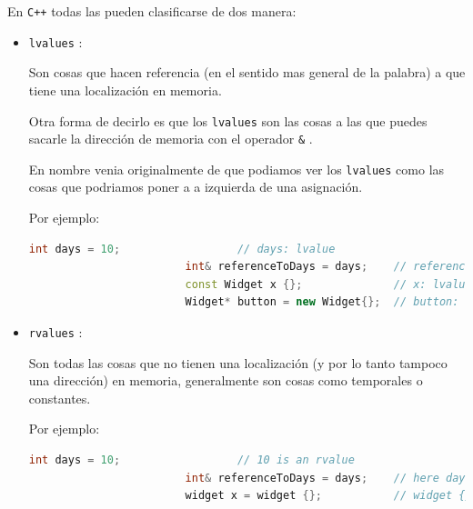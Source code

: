 \documentclass[12pt, fleqn]{report}                             %
\newcommand \Quote              {\qq}                           %
\theoremstyle{break}                                            %
\newcommand{\textCode}[1]  { \texttt{#1} }                      %
\newcommand \Cpp  {\textCode{C++} }                               %
\begin{document}
            En \Cpp todas las \Quote{cosas} pueden clasificarse de dos manera:
            \begin{itemize}
                \item \textCode{lvalues}: 
                
                    Son cosas que hacen referencia (en el sentido mas general de la palabra)
                    a \Quote{algo} que tiene una localización en memoria.

                    Otra forma de decirlo es que los \textCode{lvalues} son las cosas a las que 
                    puedes sacarle la dirección de memoria con el operador \textCode{\&}.

                    En nombre venia originalmente de que podiamos ver los \textCode{lvalues} 
                    como las cosas que podriamos poner a a izquierda de una asignación.

                    Por ejemplo:
                    \begin{lstlisting}[language=C++, gobble=24]
                        int days = 10;                  // days: lvalue
                        int& referenceToDays = days;    // referenceToDays: lvalue
                        const Widget x {};              // x: lvalue
                        Widget* button = new Widget{};  // button: lvalue
                    \end{lstlisting}

                \item \textCode{rvalues}:
                
                    Son todas las cosas que no tienen una localización (y por lo tanto tampoco una
                    dirección) en memoria, generalmente son cosas como temporales o constantes.

                    Por ejemplo:
                    \begin{lstlisting}[language=C++, gobble=24]
                        int days = 10;                  // 10 is an rvalue
                        int& referenceToDays = days;    // here days is an rvalue
                        widget x = widget {};           // widget {} is an rvalue
                    \end{lstlisting}

                    \cite{CppFromBeginningToIntermidiate}

            \end{itemize}

                
        \clearpage
\end{document}

